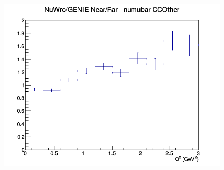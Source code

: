 \begin{figure}[h]
\endminipage
{}
\includegraphics[width=\linewidth]{eff_Q2/LAr/ratios/CCOther_NuWro_GENIE_numubar_NF_Q2.png}
\endminipage
\newline
\end{figure}
\clearpage
